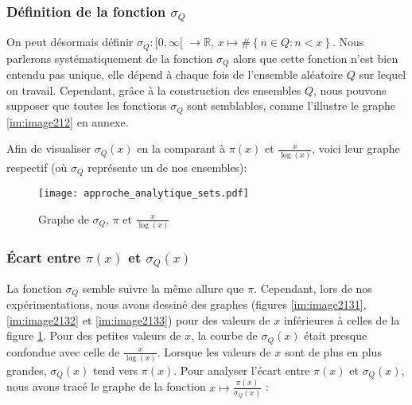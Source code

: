 \documentclass[../main.tex]{report}
\begin{document}
\subsubsection{Définition de la fonction $\sigma_{Q}$}

On peut désormais définir $ \sigma_{Q} : [0, \infty [$  $\rightarrow \mathbb{R} $, $ x \mapsto \# \left\{ n \in Q : n < x \right\} $. Nous parlerons systématiquement de  la fonction $\sigma_{Q}$ alors que cette fonction n'est bien entendu pas unique, elle dépend à chaque fois de l'ensemble aléatoire $Q$ sur lequel on travail. Cependant, grâce à la construction des ensembles $Q$, nous pouvons supposer que toutes les fonctions $\sigma_{Q}$ sont semblables, comme l'illustre le graphe \ref{im:image212} en annexe. 

Afin de visualiser  $\sigma_{Q}(x)$ en la comparant à $\pi(x)$ et $\frac{x}{\log(x)}$, voici leur graphe respectif (où $\sigma_{Q}$ représente un de nos ensembles): 

\begin{figure}[H]
 \centering
 \texttt{[image: approche\_analytique\_sets.pdf]}
 \caption{Graphe de $\sigma_{Q}$, $\pi$ et $\frac{x}{\log(x)}$ }
 \label{im:image1}
\end{figure}

\subsubsection{Écart entre $\pi(x)$ et $\sigma_{Q}(x)$}

La fonction $\sigma_{Q}$ semble suivre la même allure que $\pi$. Cependant, lors de nos expérimentations, nous avons dessiné des graphes (figures \ref{im:image2131}, \ref{im:image2132} et \ref{im:image2133}) pour des valeurs de $x$ inférieures à celles de la figure \ref{im:image1}. Pour des petites valeurs de $x$, la courbe de $\sigma_{Q}(x)$ était presque confondue avec celle de $\frac{x}{\log(x)}$. Lorsque les valeurs de $x$ sont de plus en plus grandes, $\sigma_{Q}(x)$ tend vers $\pi(x)$. Pour analyser l'écart entre $\pi(x)$ et $\sigma_{Q}(x)$, nous avons tracé le graphe de la fonction $ x \mapsto \frac{\pi(x)}{\sigma_{Q}(x)}$ : 
\end{document}
